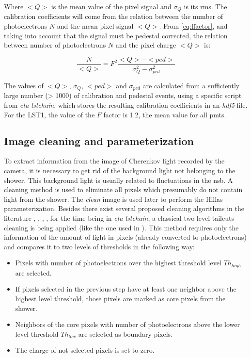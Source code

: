 \documentclass[main.tex]{subfiles}
\begin{document}
Where $<Q>$ is the mean value of the pixel signal and $\sigma_{Q}$ is its \gls{rms}. The calibration coefficients will come from the relation between the number of photoelectrons $N$ and the mean pixel signal $<Q>$. From \ref{eq:ffactor}, and taking into account that the signal must be pedestal corrected, the relation between number of photoelectrons $N$ and the pixel charge $<Q>$ is:

\begin{equation}
  \frac{N}{<Q>} = F^{2}\frac{<Q> - <ped>}{\sigma_{Q}^{2} - \sigma_{ped}^{2}}
\end{equation}

The values of $<Q>$, $\sigma_{Q}$, $<ped>$ and $\sigma_{ped}$ are calculated from a sufficiently large number (> 1000) of calibration and pedestal events, using a specific script from \textit{cta-lstchain}, which stores the resulting calibration coefficients in an \textit{hdf5} file. For the LST1, the value of the $F$ factor is 1.2, the mean value for all \glspl{pmt}.

\subsection{Image cleaning and parameterization} \label{sec:cleanpars}

To extract information from the image of Cherenkov light recorded by the camera, it is necessary to get rid of the background light not belonging to the shower. This background light is usually related to fluctuations in the \gls{nsb}. A cleaning method is used to eliminate all pixels which presumably do not contain light from the shower. The \textit{clean} image is used later to perform the Hillas parameterization. Besides there exist several proposed cleaning algorithms in the literature \cite{2019cleaningCNN}, \cite{2013neighborcleaning}, \cite{2005Cleaningwithtimeinfo}, \cite{2001waveletcleaning}, for the time being in \textit{cta-lstchain}, a classical two-level tailcuts cleaning is being applied (like the one used in \cite{1997HEGRAperformance}). This method requires only the information of the amount of light in pixels (already converted to photoelectrons) and compares it to two levels of thresholds in the following way: \\

\begin{itemize}

\item Pixels with number of photoelectrons over the highest threshold level $Th_{high}$ are selected.
\item If pixels selected in the previous step have at least one neighbor above the highest level threshold, those pixels are marked as core pixels from the shower.

\item Neighbors of the core pixels with number of photoelectrons above the lower level threshold $Th_{low}$ are selected as boundary pixels.
\item The charge of not selected pixels is set to zero. \\
\end{itemize}
\end{document}
